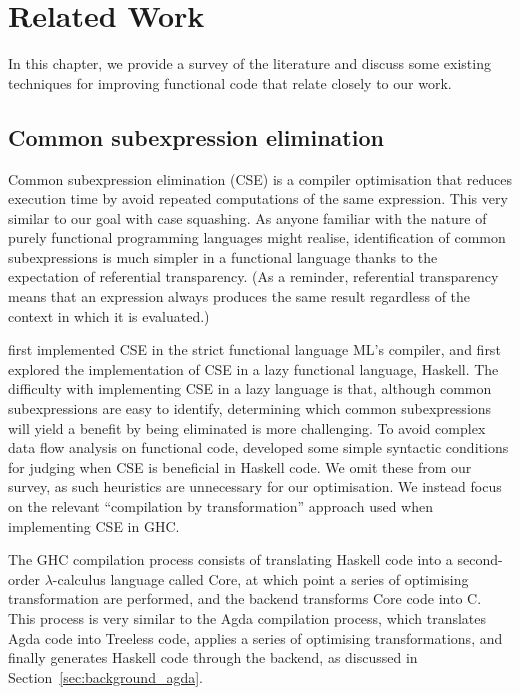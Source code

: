 \chapter{Related Work}
\label{cha:related_work}

In this chapter, we provide a survey of the literature and discuss some existing techniques for improving functional code that relate closely to our work.

\section{Common subexpression elimination}

Common subexpression elimination (CSE) is a compiler optimisation that reduces execution time by avoid repeated computations of the same expression.\citep{Chitil-1998} This very similar to our goal with case squashing. As anyone familiar with the nature of purely functional programming languages might realise, identification of common subexpressions is much simpler in a functional language thanks to the expectation of referential transparency.\citep{Chitil-1998} (As a reminder, referential transparency means that an expression always produces the same result regardless of the context in which it is evaluated.)

\citet{appel1992} first implemented CSE in the strict functional language ML's compiler, and \citet{Chitil-1998} first explored the implementation of CSE in a lazy functional language, Haskell. The difficulty with implementing CSE in a lazy language is that, although common subexpressions are easy to identify, determining which common subexpressions will yield a benefit by being eliminated is more challenging. To avoid complex data flow analysis on functional code, \citet{Chitil-1998} developed some simple syntactic conditions for judging when CSE is beneficial in Haskell code. We omit these from our survey, as such heuristics are unnecessary for our optimisation. We instead focus on the relevant ``compilation by transformation'' approach used when implementing CSE in GHC.

The GHC compilation process consists of translating Haskell code into a second-order $\lambda$-calculus language called Core, at which point a series of optimising transformation are performed, and the backend transforms Core code into C.\citep{Chitil-1998} This process is very similar to the Agda compilation process, which translates Agda code into Treeless code, applies a series of optimising transformations, and finally generates Haskell code through the backend, as discussed in Section~\ref{sec:background_agda}.

